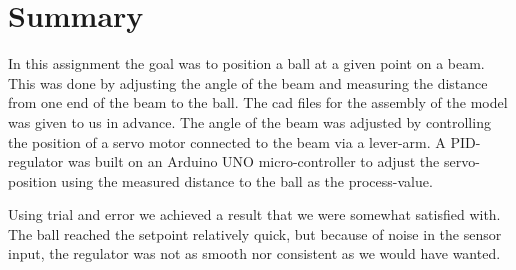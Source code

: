 \section{Summary}
In this assignment the goal was to position a ball at a given point on a beam. This was done by adjusting the angle of the beam and measuring the distance from one end of the beam to the ball. The cad files for the assembly of the model was given to us in advance. The angle of the beam was adjusted by controlling the position of a servo motor connected to the beam via a lever-arm. A PID-regulator was built on an Arduino UNO micro-controller to adjust the servo-position using the measured distance to the ball as the process-value.

Using trial and error we achieved a result that we were somewhat satisfied with. The ball reached the setpoint relatively quick, but because of noise in the sensor input, the regulator was not as smooth nor consistent as we would have wanted.